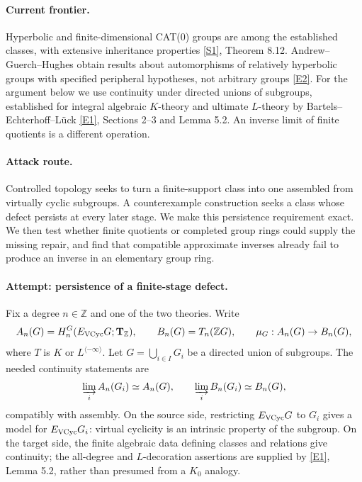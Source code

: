 \documentclass[11pt,a4paper]{article}
\newcommand{\Z}{\mathbb{Z}}
\newcommand{\sref}[2]{\hyperlink{source:#1:#2}{[S#2]}}
\newcommand{\eref}[2]{\hyperlink{extra:#1:#2}{[E#2]}}
\numberwithin{equation}{section}
\begin{document}
\paragraph{Current frontier.}
Hyperbolic and finite-dimensional CAT(0) groups are among the established classes, with extensive inheritance properties \sref{statement}{1}, Theorem 8.12. Andrew--Guerch--Hughes obtain results about automorphisms of relatively hyperbolic groups with specified peripheral hypotheses, not arbitrary groups \eref{statement}{2}. For the argument below we use continuity under directed unions of subgroups, established for integral algebraic $K$-theory and ultimate $L$-theory by Bartels--Echterhoff--Lück \eref{statement}{1}, Sections 2--3 and Lemma 5.2. An inverse limit of finite quotients is a different operation.

\paragraph{Attack route.}
Controlled topology seeks to turn a finite-support class into one assembled from virtually cyclic subgroups. A counterexample construction seeks a class whose defect persists at every later stage. We make this persistence requirement exact. We then test whether finite quotients or completed group rings could supply the missing repair, and find that compatible approximate inverses already fail to produce an inverse in an elementary group ring.

\paragraph{Attempt: persistence of a finite-stage defect.}
Fix a degree $n\in\Z$ and one of the two theories. Write
\[
 A_n(G)=H_n^G(E_{\rm VCyc}G;\mathbf T_{\Z}),\qquad
 B_n(G)=T_n(\Z G),\qquad \mu_G:A_n(G)\to B_n(G),
\]
where $T$ is $K$ or $L^{\langle-\infty\rangle}$. Let $G=\bigcup_{i\in I}G_i$ be a directed union of subgroups. The needed continuity statements are
\begin{equation}\label{r68:colimit}
 \varinjlim_i A_n(G_i)\simeq A_n(G),\qquad
 \varinjlim_i B_n(G_i)\simeq B_n(G),
\end{equation}
compatibly with assembly. On the source side, restricting $E_{\rm VCyc}G$ to $G_i$ gives a model for $E_{\rm VCyc}G_i$: virtual cyclicity is an intrinsic property of the subgroup. On the target side, the finite algebraic data defining classes and relations give continuity; the all-degree and $L$-decoration assertions are supplied by \eref{statement}{1}, Lemma 5.2, rather than presumed from a $K_0$ analogy.
\end{document}

